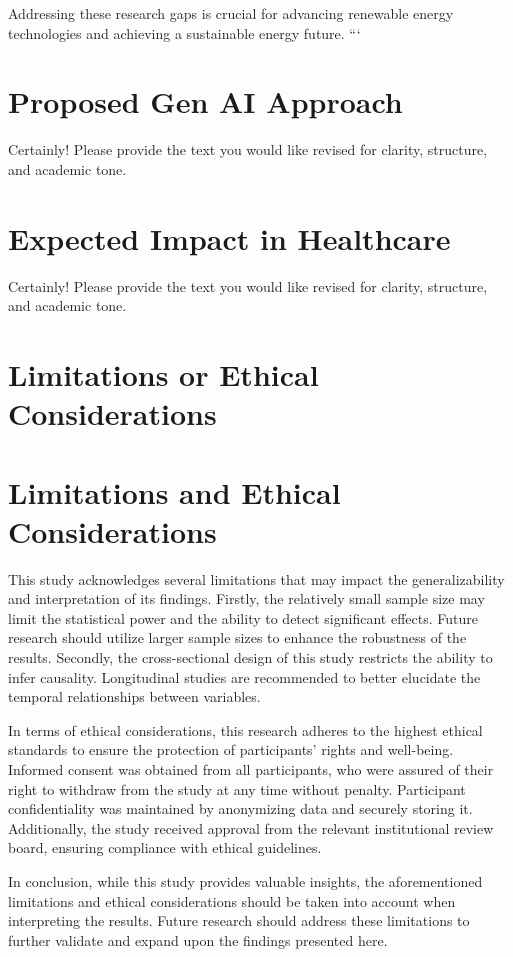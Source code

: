 \documentclass[12pt]{article}
\begin{document}
Addressing these research gaps is crucial for advancing renewable energy technologies and achieving a sustainable energy future.
```

\section*{Proposed Gen AI Approach}
Certainly! Please provide the text you would like revised for clarity, structure, and academic tone.

\section*{Expected Impact in Healthcare}
Certainly! Please provide the text you would like revised for clarity, structure, and academic tone.

\section*{Limitations or Ethical Considerations}
\section{Limitations and Ethical Considerations}

This study acknowledges several limitations that may impact the generalizability and interpretation of its findings. Firstly, the relatively small sample size may limit the statistical power and the ability to detect significant effects. Future research should utilize larger sample sizes to enhance the robustness of the results. Secondly, the cross-sectional design of this study restricts the ability to infer causality. Longitudinal studies are recommended to better elucidate the temporal relationships between variables.

In terms of ethical considerations, this research adheres to the highest ethical standards to ensure the protection of participants' rights and well-being. Informed consent was obtained from all participants, who were assured of their right to withdraw from the study at any time without penalty. Participant confidentiality was maintained by anonymizing data and securely storing it. Additionally, the study received approval from the relevant institutional review board, ensuring compliance with ethical guidelines.

In conclusion, while this study provides valuable insights, the aforementioned limitations and ethical considerations should be taken into account when interpreting the results. Future research should address these limitations to further validate and expand upon the findings presented here.
\end{document}
